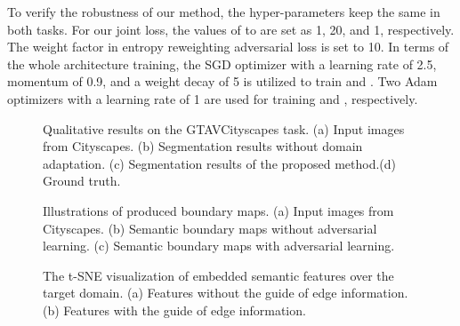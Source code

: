 \documentclass[sigconf]{acmart}
\begin{document}
\par To verify the robustness of our method, the hyper-parameters keep the same in both tasks. For our joint loss, the values of  to  are set as 1, 20, and 1, respectively. The weight factor  in entropy reweighting adversarial loss is set to 10. In terms of the whole architecture training, the SGD optimizer with a learning rate of 2.5, momentum of 0.9, and a weight decay of 5 is utilized to train  and . Two Adam optimizers with a learning rate of 1 are used for training  and , respectively.

\begin{figure*}[!t]
    \centering
    \centering
    \centering
    \centering
    \caption{Qualitative results on the GTAVCityscapes task. (a) Input images from Cityscapes. (b) Segmentation results without domain adaptation. (c) Segmentation results of the proposed method.(d) Ground truth.}
    \label{fig:3}
\end{figure*}

\begin{figure}[!t]
    \centering
    \caption{Illustrations of produced boundary maps. (a) Input images from Cityscapes. (b) Semantic boundary maps without adversarial learning. (c) Semantic boundary maps with adversarial learning.}
    \label{fig:4}
\end{figure}
\begin{figure}[!t]
    \centering
    \centering
    \caption{The t-SNE visualization of embedded semantic features over the target domain. (a) Features without the guide of edge information. (b) Features with the guide of edge information.}
    \label{fig:5}
\end{figure}
\end{document}
